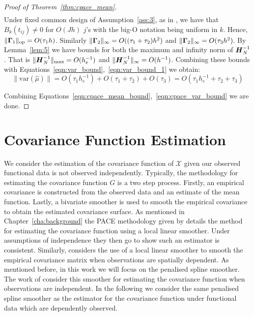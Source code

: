 \begin{proof}[Proof of Theorem~\ref{thm:cpace_mean}]
\begin{equation}
\begin{split}
	\end{split}
\label{eqn:var_bound}
\end{equation}
Under fixed common design of Assumption~\ref{ass:3}, as in \citep{xiao_asymptotic_2020}, we have that $B_k(t_{ij}) \ne 0$ for $O(Jh)$ $j$'s with the big-O notation being uniform in $k$.
Hence, $\lVert \bm{{\Gamma}}_{1}\rVert_{\text{op}}= O(\tau_1 h)$.
Similarly $\lVert \bm{{\Gamma}}_{2} \rVert_{\infty} = O(( \tau_1 + \tau_2 ) h^2)$ and $\lVert \bm{{\Gamma}}_{2}\rVert_{\infty} = O(\tau_3 h^2)$. 
By Lemma~\ref{lem:5} we have bounds for both the maximum and infinity norm of $\bm{{H}}_{N}^{-1}$.
That is $\lVert \bm{{H}}_{N}^{-1} \rVert_\text{max} = O(h_e^{-1})$ and $\lVert \bm{{H}}_{N}^{-1} \rVert_\infty= O(h^{-1})$.
Combining these bounds with Equations~\eqref{eqn:var_bound},~\eqref{eqn:var_bound_1} we obtain: 
\begin{equation}
	\lVert \text{var}\left(\hat{\mu}\right) \rVert = O(\tau_1 h_e^{-1}) + O(\tau_1 + \tau_2) + O(\tau_3) = O(\tau_1 h_e^{-1} + \tau_2 + \tau_3)
	\label{eqn:cpace_var_bound}
\end{equation}

Combining Equations~\eqref{eqn:cpace_mean_bound},~\eqref{eqn:cpace_var_bound} we are done.
\end{proof}

\section{Covariance Function Estimation \label{sec:cpace_eigen_estim}}
We consider the estimation of the covariance function of $\mathcal{X}$ given our observed functional data is not observed independently.
Typically, the methodology for estimating the covariance function $G$ is a two step process.
Firstly, an empirical covariance is constructed from the observed data and an estimate of the mean function.
Lastly, a bivariate smoother is used to smooth the empirical covariance to obtain the estimated covariance surface. 
As mentioned in Chapter~\ref{cha:background} the PACE methodology given by \citep{yao_functional_2005} details the method for estimating the covariance function using a local linear smoother. 
Under assumptions of independence they then go to show such an estimator is consistent.
Similarly, \citep{liu_functional_2017} considers the use of a local linear smoother to smooth the empirical covariance matrix when observations are spatially dependent.
As mentioned before, in this work we will focus on the penalised spline smoother. 
The work of \citep{xiao_asymptotic_2020} consider this smoother for estimating the covariance function when observations are independent. 
In the following we consider the same penalised spline smoother as the estimator for the covariance function under functional data which are dependently observed.


